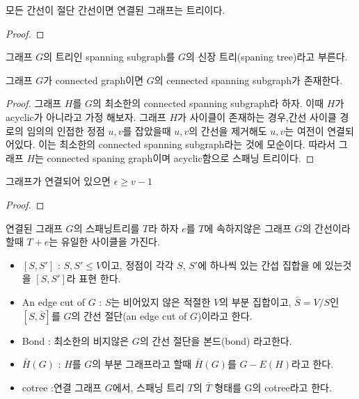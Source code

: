 \begin{theorem}
    모든 간선이 절단 간선이면 연결된 그래프는 트리이다.
\end{theorem}


\begin{proof}
    
\end{proof}

\begin{dfn}
    그래프 $G$의 트리인 spanning subgraph를 $G$의 신장 트리(spaning tree)라고 부른다.
\end{dfn}


\begin{corollary}
그래프 $G$가 connected graph이면 $G$의 cennected spanning subgraph가 존재한다.
\end{corollary}

\begin{proof}
    그래프 $H$를 $G$의 최소한의 connected spanning subgraph라 하자.
    이때 $H$가 acyclic가 아니라고 가정 해보자.
    그래프 $H$가 사이클이 존재하는 경우,간선 사이클 경로의 임의의 인접한 정점 $u, v$를 잡았을때 $u, v$의 간선을 제거해도 $u, v$는 여전이 연결되어있다. 이는 최소한의 connected spanning subgraph라는 것에 모순이다. 
    따라서 그래프 $H$는 connected spaning graph이며 acyclic함으로 스패닝 트리이다.
\end{proof}


\begin{corollary}
    그래프가 연결되어 있으면 $\epsilon \ge v-1 $    
\end{corollary}
    

\begin{proof}
    
\end{proof}

\begin{theorem}
    연결된 그래프 $G$의 스패닝트리를 $T$라 하자 $e$를 $T$에 속하지않은 그래프 $G$의 간선이라할때
    $T+e$는 유일한 사이클을 가진다.
\end{theorem}

\begin{dfn}
    \begin{itemize}
        \item  $[S,S']$ : $S,S' \le V$이고, 정점이 각각 $S$, $S'$에 하나씩 있는 간섭 집합을 에 있는것을 $[S,S']$라 표현 한다.
    
        \item  An edge cut of $G$ : $S$는 비어있지 않은 적절한 $V$의 부분 집합이고, $\bar{S} = V/S$인  $[S,\bar{S}]$를 $G$의 간선 절단(an edge cut of $G$)이라고 한다.

        \item  Bond : 최소한의 비지않은 $G$의 간선 절단을 본드(bond) 라고한다.

        \item $\bar{H}(G)$ : $H$를 $G$의 부분 그래프라고 할때 $\bar{H}(G)$를 $G-E(H)$라고 한다. 
    
        \item cotree :연결 그래프 $G$에서, 스패닝 트리 $T$의 $\bar{T}$ 형태를 G의 cotree라고 한다.
    \end{itemize}
\end{dfn}



